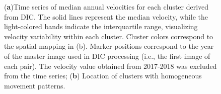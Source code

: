 \begin{figure}
    \centering
     \hfill
    \caption{(\textbf{a})Time series of median annual velocities for each cluster derived from DIC. The solid lines represent the median velocity, while the light-colored bands indicate the interquartile range, visualizing velocity variability within each cluster. Cluster colors correspond to the spatial mapping in (b). Marker positions correspond to the year of the master image used in DIC processing (i.e., the first image of each pair). The velocity value obtained from 2017-2018 was excluded from the time series; (\textbf{b}) Location of clusters with homogeneous movement patterns.}
    \label{fig:3:velocity_time_series}
\end{figure}

